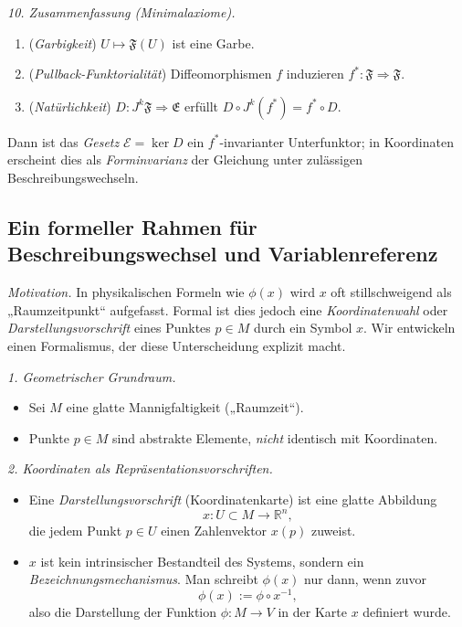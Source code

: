 \documentclass[10pt, letterpaper]{article}
\begin{document}
\bigskip
\emph{10. Zusammenfassung (Minimalaxiome).}
\begin{enumerate}
\item (\emph{Garbigkeit}) $U\mapsto \mathfrak F(U)$ ist eine Garbe.
\item (\emph{Pullback-Funktorialität}) Diffeomorphismen $f$ induzieren $f^*:\mathfrak F\Rightarrow \mathfrak F$.
\item (\emph{Natürlichkeit}) $D:J^k\mathfrak F\Rightarrow \mathfrak E$ erfüllt $D\circ J^k(f^*)=f^*\circ D$.
\end{enumerate}
Dann ist das \emph{Gesetz} $\mathcal E=\ker D$ ein $f^*$-invarianter Unterfunktor; in Koordinaten
erscheint dies als \emph{Forminvarianz} der Gleichung unter zulässigen Beschreibungswechseln.


\pagebreak

\subsection{Ein formeller Rahmen für Beschreibungswechsel und Variablenreferenz}

\emph{Motivation.}
In physikalischen Formeln wie $\phi(x)$ wird $x$ oft stillschweigend als
„Raumzeitpunkt“ aufgefasst. Formal ist dies jedoch eine \emph{Koordinatenwahl}
oder \emph{Darstellungsvorschrift} eines Punktes $p\in M$ durch ein Symbol
$x$. Wir entwickeln einen Formalismus, der diese Unterscheidung explizit macht.

\bigskip
\emph{1. Geometrischer Grundraum.}
\begin{itemize}
\item Sei $M$ eine glatte Mannigfaltigkeit („Raumzeit“).
\item Punkte $p\in M$ sind abstrakte Elemente, \emph{nicht} identisch mit Koordinaten.
\end{itemize}

\bigskip
\emph{2. Koordinaten als Repräsentationsvorschriften.}
\begin{itemize}
\item Eine \emph{Darstellungsvorschrift} (Koordinatenkarte) ist eine glatte Abbildung
\[
x:U\subset M \longrightarrow \mathbb{R}^n,
\]
die jedem Punkt $p\in U$ einen Zahlenvektor $x(p)$ zuweist.
\item $x$ ist kein intrinsischer Bestandteil des Systems, sondern ein
\emph{Bezeichnungsmechanismus}.  
Man schreibt \(\phi(x)\) nur dann, wenn zuvor
\[
\phi(x) := \phi\circ x^{-1},
\]
also die Darstellung der Funktion $\phi:M\to V$ in der Karte $x$ definiert wurde.
\end{itemize}
\end{document}
